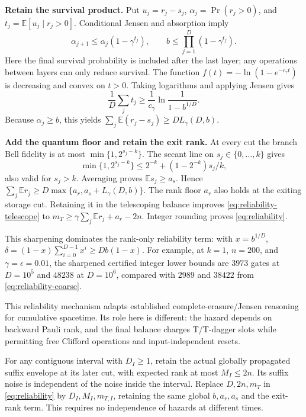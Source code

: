 \documentclass[11pt,a4paper]{article}
\numberwithin{equation}{section}
\theoremstyle{remark}\newtheorem*{remark}{Interpretation}
\newcommand{\E}{\mathbb E}
\newcommand{\eps}{\epsilon}
\begin{document}
\textbf{Retain the survival product.}
Put $u_j=r_j-s_j$, $\alpha_j=\Pr(r_j>0)$, and $t_j=\E[u_j\mid r_j>0]$. Conditional Jensen and absorption imply
\begin{equation}
\alpha_{j+1}\le\alpha_j(1-\gamma^{t_j}),\qquad
b\le\prod_{j=1}^D(1-\gamma^{t_j}).
\end{equation}
Here the final survival probability is included after the last layer; any operations between layers can only reduce survival. The function
$f(t)=-\ln(1-e^{-c_\gamma t})$ is decreasing and convex on $t>0$. Taking logarithms and applying Jensen gives
\begin{equation}
\frac1D\sum_jt_j\ge
\frac1{c_\gamma}\ln\frac1{1-b^{1/D}}.
\end{equation}
Because $\alpha_j\ge b$, this yields
$\sum_j\E(r_j-s_j)\ge D L_\gamma(D,b)$.

\textbf{Add the quantum floor and retain the exit rank.}
At every cut the branch Bell fidelity is at most $\min\{1,2^{s_j-k}\}$. The secant line on $s_j\in\{0,\ldots,k\}$ gives
\begin{equation}
\min\{1,2^{s_j-k}\}\le
2^{-k}+(1-2^{-k})s_j/k,
\end{equation}
also valid for $s_j>k$. Averaging proves $\E s_j\ge a_s$. Hence
$\sum_j\E r_j\ge D\max\{a_r,a_s+L_\gamma(D,b)\}$.
The rank floor $a_r$ also holds at the exiting storage cut. Retaining it in the telescoping balance improves \eqref{eq:reliability-telescope} to
$m_T\ge\gamma\sum_j\E r_j+a_r-2n$. Integer rounding proves \eqref{eq:reliability}.

This sharpening dominates the rank-only reliability term: with $x=b^{1/D}$,
$\delta=(1-x)\sum_{i=0}^{D-1}x^i\ge Db(1-x)$.
For example, at $k=1$, $n=200$, and $\gamma=\eps=0.01$, the sharpened certified integer lower bounds are $3973$ gates at $D=10^5$ and $48238$ at $D=10^6$, compared with $2989$ and $38422$ from \eqref{eq:reliability-coarse}.

This reliability mechanism adapts established complete-erasure/Jensen reasoning for cumulative spacetime. Its role here is different: the hazard depends on backward Pauli rank, and the final balance charges T/T-dagger slots while permitting free Clifford operations and input-independent resets.

For any contiguous interval with $D_I\ge1$, retain the actual globally propagated suffix envelope at its later cut, with expected rank at most $M_I\le2n$. Its suffix noise is independent of the noise inside the interval. Replace $D,2n,m_T$ in \eqref{eq:reliability} by $D_I,M_I,m_{T,I}$, retaining the same global $b,a_r,a_s$ and the exit-rank term. This requires no independence of hazards at different times.
\end{document}
